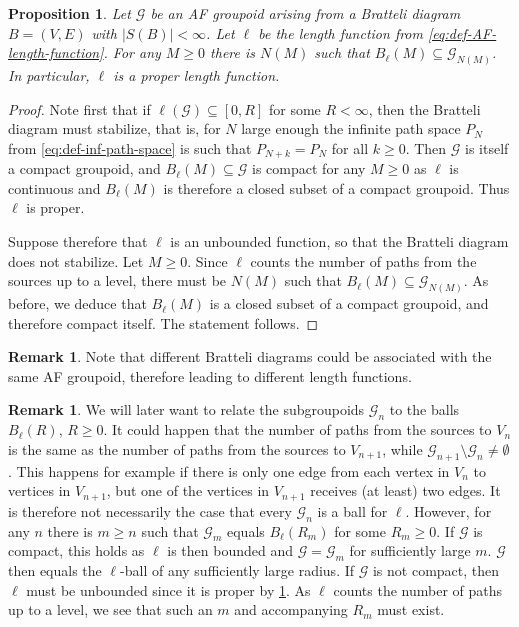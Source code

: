 \documentclass[11pt,a4paper,oneside,final,reqno]{amsart}
\newtheorem{proposition}[lemma]{Proposition}
\theoremstyle{definition}
\newtheorem{remark}[lemma]{Remark}
\newcommand{\G}{\mathcal{G}}
\numberwithin{equation}{section}
\begin{document}
	

	
	\begin{proposition}\label{prop:ell-preimage-in-subgpd}
		Let $\G$ be an AF groupoid arising from a Bratteli diagram $B = (V,E)$ with $\vert S(B)\vert < \infty$. 
		Let $\ell$ be the length function from 
		\eqref{eq:def-AF-length-function}. 
		For any $M \geq 0$ there is $N(M)$ such that $B_\ell(M) \subseteq \G_{N(M)}$. In particular, $\ell$ is a proper length function. 
	\end{proposition} 
	\begin{proof}
		Note first that if $\ell(\G) \subseteq [0, R]$ for some  $R< \infty$, then the Bratteli diagram must stabilize, that is, for $N$ large enough the infinite path space $P_N$ from \eqref{eq:def-inf-path-space} is such that $P_{N+k} = P_N$ for all $k \geq 0$.  
		Then $\G$ is itself a compact groupoid, and $B_\ell(M) \subseteq \G$ is compact for any $M \geq 0$ as $\ell$ is continuous and  $B_\ell(M)$ is therefore a closed subset of a compact groupoid.  
		Thus $\ell$ is proper.
		
		Suppose therefore that $\ell$ is an unbounded function, so that  
		the Bratteli diagram does not stabilize.
		Let $M \geq 0$. Since $\ell$ counts the number of paths from the sources up to a level, there must be $N(M)$ such that $B_\ell(M) \subseteq \G_{N(M)}$. As before, we deduce that $B_\ell(M)$ is a closed subset of a compact groupoid, and therefore compact itself. The statement follows. 
		

	\end{proof}
	
	\begin{remark}
		Note that different Bratteli diagrams could be associated with the same AF groupoid, therefore leading to different length functions. 
	\end{remark}

	\begin{remark}\label{remark:Gn-is-ball} 
		We will later want to relate the subgroupoids $\G_n$ to the balls $B_\ell(R)$, $R \geq 0$. 
		It could happen that the number of paths from the sources to $V_n$ is the same as the number of paths from the sources to $V_{n+1}$, while $\G_{n+1} \setminus \G_n \neq \emptyset$. This happens for example if there is only one edge from each vertex in $V_n$ to vertices in $V_{n+1}$, but one of the vertices in $V_{n+1}$ receives (at least) two edges. It is therefore not necessarily the case that every $\G_n$ is a ball for $\ell$.  However, for any $n$ there is $m \geq n$ such that $\G_{m}$ equals $B_\ell(R_m)$ for some $R_m \geq 0$.  If $\G$ is compact, this holds as $\ell$ is then bounded and $\G = \G_m$ for sufficiently large $m$.  $\G$ then equals the $\ell$-ball of any sufficiently large radius. If $\G$ is not compact, then $\ell$ must be unbounded since it is proper by \cref{prop:ell-preimage-in-subgpd}. As $\ell$ counts the number of paths up to a level, we see that such an $m$ and accompanying $R_m$ must exist. 
	\end{remark}
	
\end{document}
